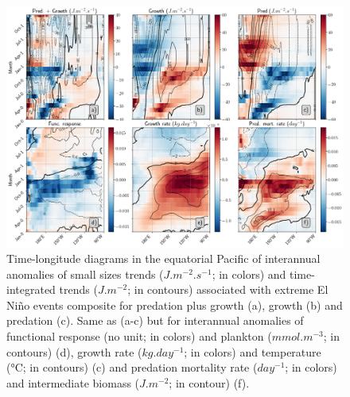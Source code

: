 \begin{figure}[h!tp]
	\centering
	\includegraphics[scale=0.4]{figs/fig8.png}	
	\caption{Time-longitude diagrams in the equatorial Pacific of interannual anomalies of small sizes trends ($J.m^{-2}.s^{-1}$; in colors) and time-integrated trends ($J.m^{-2}$; in contours) associated with extreme El Niño events composite for predation plus growth (a), growth (b) and predation (c). Same as (a-c) but for interannual anomalies of functional response (no unit; in colors) and plankton ($mmol.m^{-3}$; in contours) (d), growth rate ($kg.day^{-1}$; in colors) and temperature (°C; in contours) (c) and predation mortality rate ($day^{-1}$; in colors) and intermediate biomass ($J.m^{-2}$; in contour) (f).}
	\label{fig:fig8}
\end{figure}

